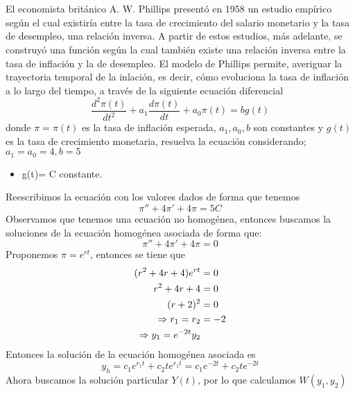 \section{}El economista británico A. W. Phillips presentó en 1958 un estudio
empírico según el cual existiría entre la tasa de crecimiento del salario monetario y la tasa de
desempleo, una relación inversa. A partir de estos estudios, más adelante, se construyó una
función según la cual también existe una relación inversa entre la tasa de inflación y la de
desempleo. El modelo de Phillips permite, averiguar la trayectoria temporal de la inlación,
es decir, cómo evoluciona la tasa de inflación a lo largo del tiempo, a través de la siguiente
ecuación diferencial
$$\frac{d^{2}\pi (t)}{dt^{2}} + a_{1}\frac{d\pi (t)}{dt} + a_{0}\pi (t) = bg(t)$$
donde $\pi=\pi(t)$ es la tasa de inflación esperada, $a_{1},a_{0},b$ son constantes y $g(t)$ es la tasa de crecimiento monetaria, resuelva la ecuación considerando; $a_{1}=a_{0}=4,b=5$
\begin{itemize}
    \item g(t)= C constante.
\end{itemize}

Reescribimos la ecuación con los valores dados de forma que tenemos
\begin{equation}
    \pi'' + 4\pi' + 4\pi = 5C
\end{equation}
Observamos que tenemos una ecuación no homogénea, entonces buscamos la soluciones de la ecuación homogénea asociada de forma que:
\begin{equation*}
    \pi'' + 4\pi' + 4\pi = 0
\end{equation*}
Proponemos $\pi=e^{rt}$, entonces se tiene que
\begin{equation*}
\centering
\begin{split}
    (r^{2} + 4r + 4)e^{rt} &= 0 \\   
    r^{2} + 4r + 4 &= 0 \\
    (r + 2)^{2} &= 0 \\
    \Rightarrow r_{1}=r_{2} &=-2 \\
    \Rightarrow y_{1} = e^{-2t}
    y_{2}
\end{split}
\end{equation*}
Entonces la solución de la ecuación homogénea asociada es
\begin{equation}
     y_{h} = c_{1}e^{r_{1}t} +c_{2}te^{r_{1}t} = c_{1}e^{-2t} +c_{2}te^{-2t}
\label{eq:homogenea}
\end{equation}
Ahora buscamos la solución particular $Y(t)$, por lo que calculamos $W(y_{1},y_{2})$

